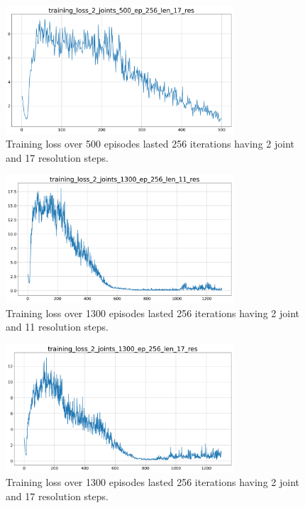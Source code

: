 \documentclass[twocolumn, a4paper]{article}
\begin{document}
\begin{figure}[H]
	\centering
	\includegraphics[width=8.5cm]{"../Figures/training_loss_2J_500E_256EL_17RES.png"}
	\caption{Training loss over 500 episodes lasted 256 iterations having 2
			 joint and 17 resolution steps.}
	\label{fig:TrainLoss_2_500_17}
\end{figure}
\vspace{-1cm}
\vspace{0.3cm}
\begin{figure}[H]
	\centering
	\includegraphics[width=8.5cm]{"../Figures/training_loss_2J_1300E_256EL_11RES.png"}
	\caption{Training loss over 1300 episodes lasted 256 iterations having 2
			 joint and 11 resolution steps.}
	\label{fig:TrainLoss_2_1300_11}
\end{figure}

\begin{figure}[H]
	\centering
	\includegraphics[width=8.5cm]{"../Figures/training_loss_2J_1300E_256EL_17RES.png"}
	\caption{Training loss over 1300 episodes lasted 256 iterations having 2
			 joint and 17 resolution steps.}
	\label{fig:TrainLoss_2_1300_17}
\end{figure}
\end{document}
